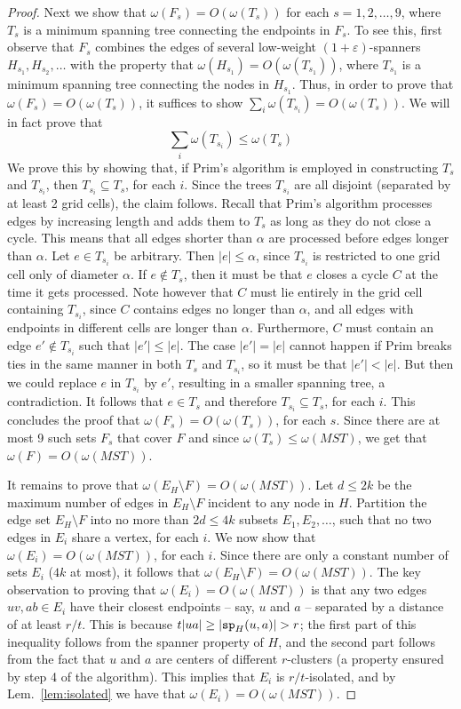 \documentclass{llncs}
\newcommand{\e}{\varepsilon}
\newcommand{\ssp}{{\tt sp}}
\newcommand{\w}{\omega}
\begin{document}
\begin{proof}
Next we show that $\w(F_s) =O(\w(T_s))$ for each $s = 1,2,\ldots, 9$, where
$T_{s}$ is a minimum spanning tree connecting the endpoints in $F_s$.
To see this, first observe that $F_s$ combines the edges of several low-weight $(1+\e)$-spanners
$H_{s_1}, H_{s_2}, \ldots$ with the property that $\w(H_{s_1}) = O(\w(T_{s_1}))$,
where $T_{s_1}$ is a minimum spanning tree connecting the nodes in $H_{s_1}$. Thus, in order
to prove that $\w(F_s) = O(\w(T_s))$, it suffices to show
$\sum_i \w(T_{s_i}) = O(\w(T_s))$. We will in fact prove that
\[
\sum_i \w(T_{s_i}) \le \w(T_s)
\]
We prove this by showing that, if Prim's algorithm is employed in constructing $T_s$ and $T_{s_i}$, then
$T_{s_i} \subseteq T_s$, for each $i$. Since the trees $T_{s_i}$ are all disjoint (separated by at
least 2 grid cells), the claim follows.
Recall that Prim's algorithm processes edges by increasing length and adds them to
$T_s$ as long as they do not close a cycle. This means that all edges shorter than
$\alpha$ are processed before edges longer than $\alpha$. Let $e \in T_{s_i}$ be
arbitrary. Then $|e| \le \alpha$, since $T_{s_i}$ is restricted to one grid cell only of diameter $\alpha$.
If $e \not\in T_s$, then it must be that $e$ closes a cycle $C$ at the time it gets
processed. Note however that $C$ must lie entirely in the grid cell containing
$T_{s_i}$, since $C$ contains edges no longer than $\alpha$, and all edges with endpoints
in different cells are longer than $\alpha$.
Furthermore, $C$ must contain an edge $e' \not\in T_{s_i}$ such that $|e'| \le |e|$. The
case $|e'| = |e|$ cannot happen if Prim breaks ties in the same manner in both
$T_s$ and $T_{s_i}$, so it must be that $|e'| < |e|$.
But then we could replace $e$ in $T_{s_i}$ by $e'$, resulting in a smaller
spanning tree, a contradiction. It follows that $e \in T_s$ and therefore
$T_{s_i} \subseteq T_s$, for each $i$. This concludes the proof that
$\w(F_s) = O(\w(T_s))$, for each $s$. Since there are at most 9 such sets
$F_s$ that cover $F$ and since $\w(T_s) \le \w(MST)$, we get that $\w(F) = O(\w(MST))$.

It remains to prove that $\w(E_H \setminus F) = O(\w(MST))$.
Let $d \le 2k$ be the maximum number of edges in $E_H \setminus F$ incident to any node in $H$.
Partition the edge set $E_H \setminus F$ into no more than $2d \le 4k$ subsets
$E_1, E_2, \ldots$, such that no two edges in $E_i$ share a vertex, for each $i$.
We now show that $\w(E_i) = O(\w(MST))$, for each $i$. Since there are only a
constant number of sets $E_i$ ($4k$ at most), it follows that $\w(E_H \setminus F) = O(\w(MST))$.
The key observation to proving that $\w(E_i) = O(\w(MST))$ is that any two edges $uv, ab \in E_i$ have
their closest endpoints -- say, $u$ and $a$ --
separated by a distance of at least $r/t$. This is because
$t|ua| \ge |\ssp_H(u,a)| > r$;
the first part of this inequality follows from the spanner property of $H$, and
the second part follows from the fact that $u$ and $a$ are centers of different
$r$-clusters (a property ensured by step 4 of the algorithm). This implies that
$E_i$ is $r/t$-isolated, and by Lem.~\ref{lem:isolated} we have that
$\w(E_i) = O(\w(MST))$.


\end{proof}
\end{document}

